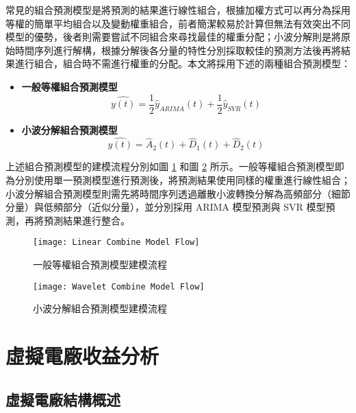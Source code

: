常見的組合預測模型是將預測的結果進行線性組合，根據加權方式可以再分為採用等權的簡單平均組合以及變動權重組合，前者簡潔較易於計算但無法有效突出不同模型的優勢，後者則需要嘗試不同組合來尋找最佳的權重分配；小波分解則是將原始時間序列進行解構，根據分解後各分量的特性分別採取較佳的預測方法後再將結果進行組合，組合時不需進行權重的分配。本文將採用下述的兩種組合預測模型：

\begin{itemize}
  \item \textbf{一般等權組合預測模型}
    \begin{equation}\label{equation: Normal Combine Model}
      \hat{y(t)} = \frac{1}{2} \hat{y}_{ARIMA} (t) + \frac{1}{2} \hat{y}_{SVR} (t)
    \end{equation}
  \item \textbf{小波分解組合預測模型}
    \begin{equation}\label{equation: Wavelet Combine Model}
      \hat{y(t)} = \hat{A}_{2} (t) + \hat{D}_{1} (t) + \hat{D}_{2} (t)
    \end{equation}
\end{itemize}

上述組合預測模型的建模流程分別如圖 \ref{figure: Linear Combine Model Flow} 和圖 \ref{figure: Wavelet Combine Model Flow} 所示。一般等權組合預測模型即為分別使用單一預測模型進行預測後，將預測結果使用同樣的權重進行線性組合；小波分解組合預測模型則需先將時間序列透過離散小波轉換分解為高頻部分（細節分量）與低頻部分（近似分量），並分別採用 ARIMA 模型預測與 SVR 模型預測，再將預測結果進行整合。

\begin{figure}[htbp]
  \centering
  \texttt{[image: Linear Combine Model Flow]}
  \caption[一般等權組合預測模型建模流程]{一般等權組合預測模型建模流程}
  \label{figure: Linear Combine Model Flow}
\end{figure}

\begin{figure}[htbp]
  \centering
  \texttt{[image: Wavelet Combine Model Flow]}
  \caption[小波分解組合預測模型建模流程]{小波分解組合預測模型建模流程}
  \label{figure: Wavelet Combine Model Flow}
\end{figure}

\section{虛擬電廠收益分析}

\subsection{虛擬電廠結構概述}

